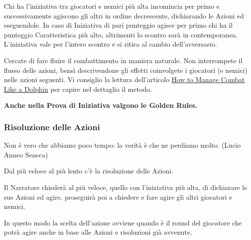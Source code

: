\begin{multicols}{2}
Chi ha l'iniziativa tra giocatori e nemici più alta incomincia per primo e successivamente agiscono gli altri in ordine decrescente, dichiarando le Azioni ed eseguendole. In caso di Iniziativa di pari punteggio agisce per primo chi ha il punteggio Caratteristica più alto, altrimenti lo scontro sarà in contemporanea. L'iniziativa vale per l'intero scontro e si ritira al cambio dell'avversario.

\begin{changemargin}{0.3cm}{0.3cm}\begin{narratore} %
Cercate di fare fluire il combattimento in maniera naturale. Non interrompete il flusso delle azioni, bensì descrivendone gli effetti coinvolgete i giocatori (e nemici) nelle azioni seguenti. Vi consiglio la lettura dell'articolo \href{https://theangrygm.com/manage-combat-like-a-dolphin/}{How to Manage Combat Like a Dolphin} per capire nel dettaglio il metodo.
\end{narratore}\end{changemargin}

\textbf{Anche nella Prova di Iniziativa valgono le Golden Rules.}

\subsubsection{Risoluzione delle Azioni}\label{risoluzionedelleazioni}

\begin{changemargin}{0.3cm}{0.3cm}\begin{enfasi}{
Non è vero che abbiamo poco tempo: la verità è che ne perdiamo molto. (Lucio Anneo Seneca)
}
\end{enfasi}\end{changemargin}\medskip

Dal più veloce al più lento c'è la risoluzione delle Azioni.

Il Narratore chiederà al più veloce, quello con l'iniziativa più alta, di dichiarare le sue Azioni ed agire, proseguirà poi a chiedere e fare agire gli altri giocatori e nemici.

In questo modo la scelta dell'azione avviene quando è il round del giocatore che potrà agire anche in base alle Azioni e risoluzioni già avvenute.



\end{multicols}
